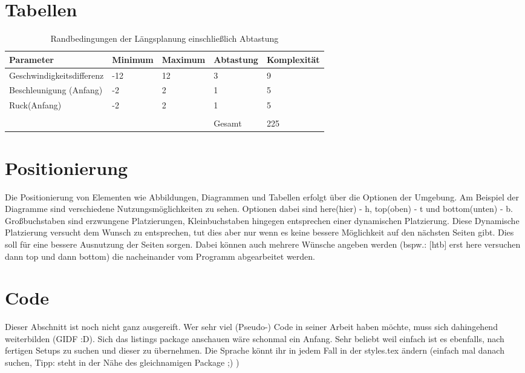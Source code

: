 \section{Tabellen}

\begin{table}[htb]
	\centering
	\begin{tabular}{p{4.7cm}|p{2cm}|p{2cm}|p{2cm}|p{2cm}}
		\rowcolor{headrowcolor}
		Parameter & Minimum & Maximum & Abtastung & Komplexität \\ \hline
		Geschwindigkeitsdifferenz & -12 & 12 & 3 & 9 \\ 
		Beschleunigung (Anfang) & -2 & 2 & 1 & 5 \\ 
		Ruck(Anfang) & -2 & 2 & 1 & 5 \\ 
		& & & & \\
		&  &  & Gesamt & 225 \\ 
	\end{tabular} 
	\caption{Randbedingungen der Längsplanung einschließlich Abtastung}
	\label{tab:param_raster_laengs}
\end{table}

\section{Positionierung}
Die Positionierung von Elementen wie Abbildungen, Diagrammen und Tabellen erfolgt über die Optionen der Umgebung. Am Beispiel der Diagramme sind verschiedene Nutzungsmöglichkeiten zu sehen. Optionen dabei sind here(hier) - h, top(oben) - t und bottom(unten) - b. Großbuchstaben sind erzwungene Platzierungen, Kleinbuchstaben hingegen entsprechen einer dynamischen Platzierung. Diese Dynamische Platzierung versucht dem Wunsch zu entsprechen, tut dies aber nur wenn es keine bessere Möglichkeit auf den nächsten Seiten gibt. Dies soll für eine bessere Ausnutzung der Seiten sorgen. Dabei können auch mehrere Wünsche angeben werden (bspw.: $[$htb$]$ erst here versuchen dann top und dann bottom) die nacheinander vom Programm abgearbeitet werden.

\section{Code}

Dieser Abschnitt ist noch nicht ganz ausgereift. Wer sehr viel (Pseudo-) Code in seiner Arbeit haben möchte, muss sich dahingehend weiterbilden (GIDF :D). Sich das listings package anschauen wäre schonmal ein Anfang. Sehr beliebt weil einfach ist es ebenfalls, nach fertigen Setups zu suchen und dieser zu übernehmen. Die Sprache könnt ihr in jedem Fall in der styles.tex ändern (einfach mal danach suchen, Tipp: steht in der Nähe des gleichnamigen Package ;) )

